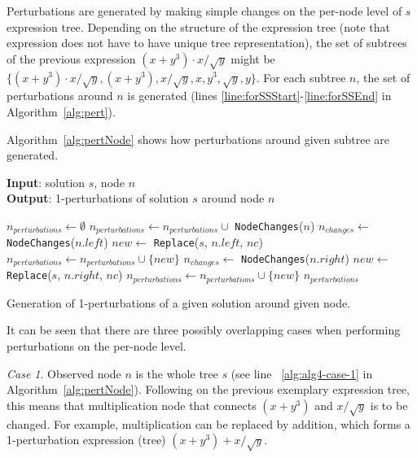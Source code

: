 \documentclass[a4paper,12pt]{elsarticle}
\begin{document}
Perturbations are generated by making simple changes on the per-node level of $s$ expression tree.
Depending on the structure of the expression tree (note that expression does not have to have unique tree representation), the set of subtrees of the previous expression $(x+y^3)\cdot x/\sqrt{y}$ might be $\{(x+y^3)\cdot x/\sqrt{y}, (x+y^3), x/\sqrt{y}, x, y^3, \sqrt{y}, y\}$. %
For each subtree $n$, the set of perturbations around $n$ is generated (lines \ref{line:forSSStart}-\ref{line:forSSEnd} in Algorithm~\ref{alg:pert}).   


Algorithm~\ref{alg:pertNode} shows how perturbations around given subtree are generated.

\begin{algorithm}	
	\hspace*{\algorithmicindent} \textbf{Input}: solution $s$, node $n$\\
	\hspace*{\algorithmicindent} \textbf{Output}: 1-perturbations of solution $s$ around node $n$
	\begin{algorithmic}[1]
		\State $n_{perturbations} \gets \emptyset$
		 \label{alg:alg4-case-1}
		\State $n_{perturbations} \gets n_{perturbations} \cup$ \texttt{NodeChanges}($n$)
		\EndIf
		\label{alg:alg4-case-2}
		\State $n_{changes} \gets$ \texttt{NodeChanges}($n.left$)
		\State $new \gets$ \texttt{Replace}($s$, $n.left$, $nc$)
		\State $n_{perturbations} \gets n_{perturbations} \cup \{new\}$
		\EndFor
		\EndIf
		\label{alg:alg4-case-3}
		\State $n_{changes} \gets$ \texttt{NodeChanges}($n.right$)
		\State $new \gets$ \texttt{Replace}($s$, $n.right$, $nc$)
		\State $n_{perturbations} \gets n_{perturbations} \cup \{new\}$
		\EndFor
		\EndIf
		\State \Return $n_{perturbations}$
		\EndProcedure
	\end{algorithmic}
	\caption{Generation of 1-perturbations of a given solution around given node.}
	\label{alg:pertNode}
\end{algorithm}

It can be seen that there are three possibly overlapping cases when performing perturbations on the per-node level. 

\emph{Case 1}. 
Observed node $n$ is the whole tree $s$ (see line ~\ref{alg:alg4-case-1} in Algorithm~\ref{alg:pertNode}). Following on   the previous exemplary expression tree, this means that multiplication node that connects $(x+y^3)$ and $x/\sqrt{y}$ is to be changed. For example, multiplication can be replaced by addition, which forms a 1-perturbation expression (tree) $(x+y^3)+ x/\sqrt{y}$. 
\end{document}
